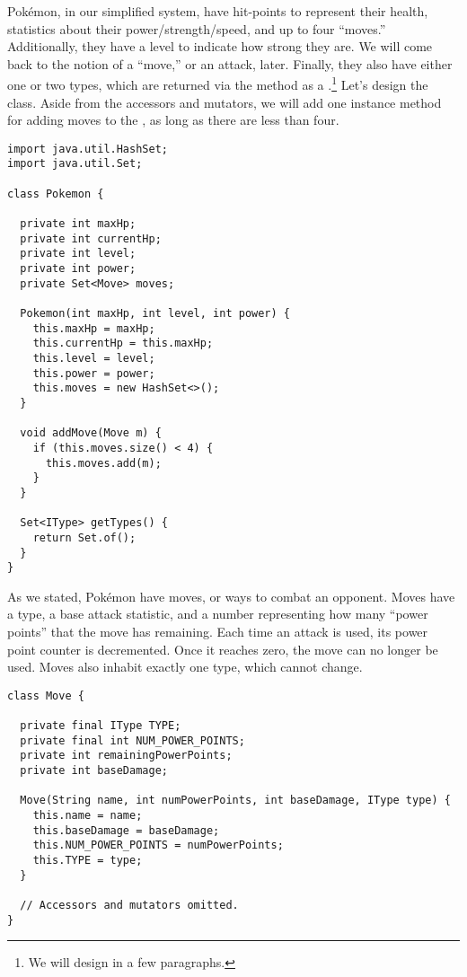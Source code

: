 
Pok\'emon, in our simplified system, have hit-points to represent their health, statistics about their power/strength/speed, and up to four ``moves.'' Additionally, they have a level to indicate how strong they are. We will come back to the notion of a ``move,'' or an attack, later. Finally, they also have either one or two types, which are returned via the  method as a .\footnote{We will design  in a few paragraphs.} Let's design the  class. Aside from the accessors and mutators, we will add one instance method for adding moves to the , as long as there are less than four. 

\begin{lstlisting}[language=MyJava]
import java.util.HashSet;
import java.util.Set; 

class Pokemon {
  
  private int maxHp;
  private int currentHp;
  private int level;
  private int power;
  private Set<Move> moves;

  Pokemon(int maxHp, int level, int power) {
    this.maxHp = maxHp;
    this.currentHp = this.maxHp;
    this.level = level;
    this.power = power;
    this.moves = new HashSet<>();
  }

  void addMove(Move m) { 
    if (this.moves.size() < 4) {
      this.moves.add(m);
    }
  }

  Set<IType> getTypes() {
    return Set.of();
  }
}
\end{lstlisting}

As we stated, Pok\'emon have moves, or ways to combat an opponent. Moves have a type, a base attack statistic, and a number representing how many ``power points'' that the move has remaining. Each time an attack is used, its power point counter is decremented. Once it reaches zero, the move can no longer be used. Moves also inhabit exactly one type, which cannot change.

\begin{lstlisting}[language=MyJava]
class Move {

  private final IType TYPE;
  private final int NUM_POWER_POINTS;
  private int remainingPowerPoints;
  private int baseDamage;

  Move(String name, int numPowerPoints, int baseDamage, IType type) {
    this.name = name;
    this.baseDamage = baseDamage;
    this.NUM_POWER_POINTS = numPowerPoints;
    this.TYPE = type;
  }

  // Accessors and mutators omitted.
}
\end{lstlisting}

